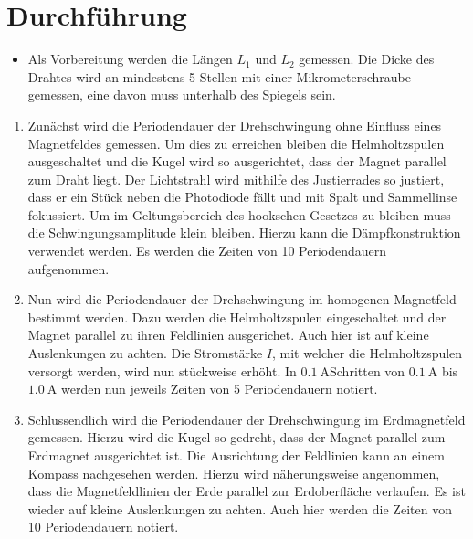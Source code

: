 
\section{Durchführung}
\label{sec:Durchführung}

\begin{itemize}
   \item Als Vorbereitung werden die Längen $L_1$ und $L_2$ gemessen. Die Dicke des
   Drahtes wird an mindestens 5 Stellen mit einer Mikrometerschraube gemessen,
   eine davon muss unterhalb des Spiegels sein.
\end{itemize}
\renewcommand{\labelenumi}{\alph{enumi})}

\begin{enumerate}
  \item Zunächst wird die Periodendauer der Drehschwingung ohne Einfluss
   eines Magnetfeldes gemessen. Um dies zu erreichen bleiben die Helmholtzspulen
    ausgeschaltet und die Kugel wird so ausgerichtet, dass der Magnet parallel zum Draht
    liegt. Der Lichtstrahl wird mithilfe des Justierrades so justiert,
     dass er ein Stück neben die Photodiode fällt und mit Spalt und Sammellinse
      fokussiert. Um im Geltungsbereich des hookschen Gesetzes zu bleiben muss
       die Schwingungsamplitude klein bleiben. Hierzu kann die Dämpfkonstruktion
        verwendet werden. Es werden die Zeiten von 10 Periodendauern aufgenommen.

        \item Nun wird die Periodendauer der Drehschwingung im
         homogenen Magnetfeld bestimmt werden. Dazu werden die Helmholtzspulen
          eingeschaltet und der Magnet parallel zu ihren Feldlinien ausgerichet.
           Auch hier ist auf kleine Auslenkungen zu achten.
          Die Stromstärke $I$, mit welcher die Helmholtzspulen versorgt werden,
           wird nun stückweise erhöht. In $\SI{0.1}{\ampere}$Schritten von
           $\SI{0.1}{\ampere}$ bis $\SI{1.0}{\ampere}$ werden nun jeweils
Zeiten von 5 Periodendauern notiert.

      \item Schlussendlich wird die Periodendauer der Drehschwingung im Erdmagnetfeld gemessen.
       Hierzu wird die Kugel so gedreht, dass der Magnet parallel zum Erdmagnet
        ausgerichtet ist. Die Ausrichtung der Feldlinien kann an einem Kompass
         nachgesehen werden. Hierzu wird näherungsweise angenommen, dass
 die Magnetfeldlinien der Erde parallel zur Erdoberfläche verlaufen.
 Es ist wieder auf kleine Auslenkungen zu achten.
          Auch hier werden die Zeiten von 10 Periodendauern notiert.



\end{enumerate}
